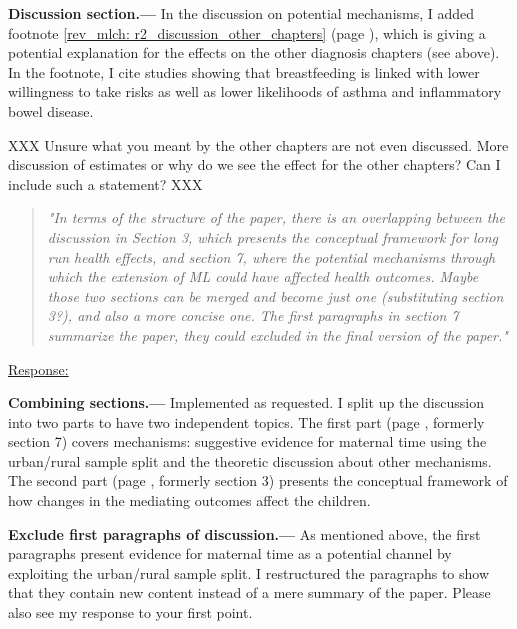 \textbf{Discussion section.---} In the discussion on potential mechanisms, I added footnote \ref{rev_mlch: r2_discussion_other_chapters} (page \pageref{rev_mlch: r2_discussion_other_chapters}), which is giving a potential explanation for the effects on the other diagnosis chapters (see above). In the footnote, I cite studies showing that breastfeeding is linked with lower willingness to take risks as well as lower likelihoods of asthma and inflammatory bowel disease.


XXX Unsure what you meant by the other chapters are not even discussed. More discussion of estimates or why do we see the effect for the other chapters?
Can I include such a statement? XXX

\begin{quote}
	\textit{"In terms of the structure of the paper, there is an overlapping between the discussion in Section 3, which presents the conceptual framework for long run health effects, and section 7, where the potential mechanisms through which the extension of ML could have affected health outcomes. Maybe those two sections can be merged and become just one (substituting section 3?), and also a more concise one. The first paragraphs in section 7 summarize the paper, they could excluded in the final version of the paper."}
\end{quote}
\underline{Response:} 

\textbf{Combining sections.---} Implemented as requested. I split up the discussion into two parts to have two independent topics. The first part (page \pageref{sec_mlch:discussion}, formerly section 7) covers mechanisms: suggestive evidence for maternal time using the urban/rural sample split and the theoretic discussion about other mechanisms. The second part (page \pageref{rev_mlch: restructure_discussion_framework}, formerly section 3) presents the conceptual framework of how changes in the mediating outcomes affect the children.

\textbf{Exclude first paragraphs of discussion.---} As mentioned above, the first paragraphs present evidence for maternal time as a potential channel by exploiting the urban/rural sample split. I restructured the paragraphs to show that they contain new content instead of a mere summary of the paper. Please also see my response to your first point.

 

